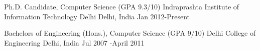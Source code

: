 \begin{cventries}
  \cventry
    {Ph.D. Candidate, Computer Science (GPA 9.3/10)}
    {Indraprashta Institute of Information Technology Delhi}
    {Delhi, India}
    {Jan 2012-Present}
	
	
  \cventry
   {Bachelors of Engineering (Hons.), Computer Science (GPA 9/10)}
   {Delhi College of Engineering}
   {Delhi, India}
   {Jul 2007 -April 2011}
   
  \end{cventries}
